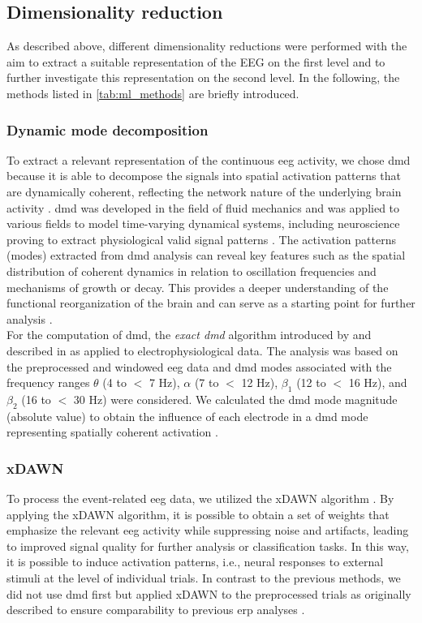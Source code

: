 \subsection{Dimensionality reduction}
As described above, different dimensionality reductions were performed with the aim to extract a suitable representation of the EEG on the first level and to further investigate this representation on the second level. In the following, the methods listed in \autoref{tab:ml_methods} are briefly introduced. 

\subsubsection{Dynamic mode decomposition}
To extract a relevant representation of the continuous \gls{eeg} activity, we chose \gls{dmd} because it is able to decompose the signals into spatial activation patterns that are dynamically coherent, reflecting the network nature of the underlying brain activity \cite{Brunton2016}. \Gls{dmd} was developed in the field of fluid mechanics and was applied to various fields to model time-varying dynamical systems, including neuroscience proving to extract physiological valid signal patterns \cite{Brunton2016, Kunert-Graf2019, Schmid2010, Schmid2008}. The activation patterns (modes) extracted from \gls{dmd} analysis can reveal key features such as the spatial distribution of coherent dynamics in relation to oscillation frequencies and mechanisms of growth or decay. This provides a deeper understanding of the functional reorganization of the brain and can serve as a starting point for further analysis \cite{Brunton2016}.\\
For the computation of \gls{dmd}, the \textit{exact \gls{dmd}} algorithm introduced by \citeauthor{Tu2014} \cite{Tu2014} and described in \cite{Brunton2016} as applied to electrophysiological data. The analysis was based on the preprocessed and windowed \gls{eeg} data and \gls{dmd} modes associated with the frequency ranges $\theta$ (4 to $<$ 7 Hz), $\alpha$ (7 to $<$ 12 Hz), $\beta_1$ (12 to $<$ 16 Hz), and $\beta_2$ (16 to $<$ 30 Hz) were considered. We calculated the \gls{dmd} mode magnitude (absolute value) to obtain the influence of each electrode in a \gls{dmd} mode representing spatially coherent activation \cite{Brunton2016}.

\subsubsection{xDAWN}
To process the event-related \gls{eeg} data, we utilized the xDAWN algorithm \cite{rivet2009xdawn}. By applying the xDAWN algorithm, it is possible to obtain a set of weights that emphasize the relevant \gls{eeg} activity while suppressing noise and artifacts, leading to improved signal quality for further analysis or classification tasks. In this way, it is possible to induce activation patterns, i.e., neural responses to external stimuli at the level of individual trials. In contrast to the previous methods, we did not use \gls{dmd} first but applied xDAWN to the preprocessed trials as originally described to ensure comparability to previous \gls{erp} analyses \cite{Reuter2019}.


